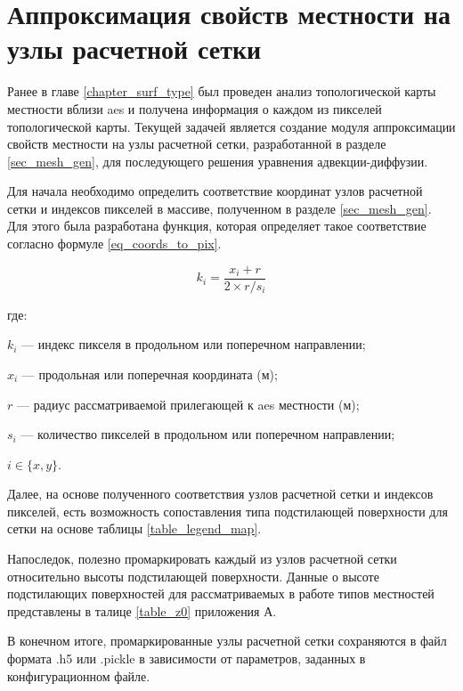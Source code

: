 \section{Аппроксимация свойств местности на узлы расчетной сетки}

Ранее в главе \ref{chapter_surf_type} был проведен анализ топологической карты местности вблизи \ac{aes} и получена 
информация о каждом из пикселей топологической карты. Текущей задачей является создание модуля аппроксимации свойств 
местности на узлы расчетной сетки, разработанной в разделе \ref{sec_mesh_gen}, для последующего решения уравнения 
адвекции-диффузии.

Для начала необходимо определить соответствие координат узлов расчетной сетки и индексов пикселей в массиве, полученном 
в разделе \ref{sec_mesh_gen}. Для этого была разработана функция, которая определяет такое соответствие согласно формуле 
\ref{eq_coords_to_pix}.

\begin{equation}
    \label{eq_coords_to_pix}
	k_i = \frac{x_i+r}{2 \times r / s_i}    
\end{equation}

где:
\begin{description}
    \item $k_i$ --- индекс пикселя в продольном или поперечном направлении;
    \item $x_i$ --- продольная или поперечная координата (м);
    \item $r$ --- радиус рассматриваемой прилегающей к \ac{aes} местности (м);
    \item $s_i$ --- количество пикселей в продольном или поперечном направлении;
    \item $i \in \{x, y\}$.
\end{description}

Далее, на основе полученного соответствия узлов расчетной сетки и индексов пикселей, есть возможность сопоставления типа 
подстилающей поверхности для сетки на основе таблицы \ref{table_legend_map}. 

Напоследок, полезно промаркировать каждый из узлов расчетной сетки относительно высоты подстилающей поверхности. Данные 
о высоте подстилающих поверхностей для рассматриваемых в работе типов местностей представлены в талице \ref{table_z0} 
приложения А. 

В конечном итоге, промаркированные узлы расчетной сетки сохраняются в файл формата .h5 или .pickle в зависимости от 
параметров, заданных в конфигурационном файле. 

